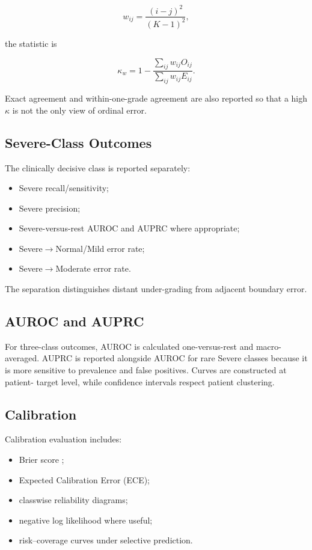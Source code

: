 \[
w_{ij}=\frac{(i-j)^2}{(K-1)^2},
\]

the statistic is

\begin{equation}
\kappa_w
=
1-
\frac{
\sum_{ij}w_{ij}O_{ij}
}{
\sum_{ij}w_{ij}E_{ij}
}.
\label{eq:weighted-kappa}
\end{equation}

Exact agreement and within-one-grade agreement are also reported so that a high
$\kappa$ is not the only view of ordinal error.

\subsection{Severe-Class Outcomes}
\label{sec:method-severe}

The clinically decisive class is reported separately:

\begin{itemize}
  \item Severe recall/sensitivity;
  \item Severe precision;
  \item Severe-versus-rest AUROC and AUPRC where appropriate;
  \item Severe$\rightarrow$Normal/Mild error rate;
  \item Severe$\rightarrow$Moderate error rate.
\end{itemize}

The separation distinguishes distant under-grading from adjacent boundary error.

\subsection{AUROC and AUPRC}
\label{sec:method-auroc}

For three-class outcomes, AUROC is calculated one-versus-rest and macro-averaged.
AUPRC is reported alongside AUROC for rare Severe classes because it is more
sensitive to prevalence and false positives. Curves are constructed at patient-
target level, while confidence intervals respect patient clustering.

\subsection{Calibration}
\label{sec:method-calibration-metrics}

Calibration evaluation includes:

\begin{itemize}
  \item Brier score \cite{brier1950verification};
  \item Expected Calibration Error (ECE);
  \item classwise reliability diagrams;
  \item negative log likelihood where useful;
  \item risk--coverage curves under selective prediction.
\end{itemize}

